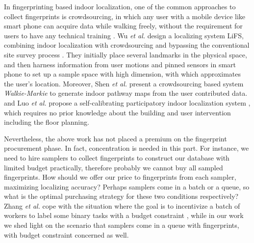 \documentclass[10pt,conference,compsocconf,letterpaper]{IEEEtran}
\begin{document}
In fingerprinting based indoor localization, one of the common approaches to collect fingerprints is crowdsourcing, in which any user with a mobile device like smart phone can acquire data while walking freely, without the requirement for users to have any technical training \cite{}. Wu \emph{et al.} design a localizing system LiFS, combining indoor localization with crowdsourcing and bypassing the conventional site survey process \cite{Yang12,Chenshu14}. They initially place several landmarks in the physical space, and then harness information from user motions and pinned sensors in smart phone to set up a sample space with high dimension, with which approximates the user's location. %
Moreover, Shen \emph{et al.} present a crowdsourcing based system \emph{Walkie-Markie} \cite{walkie} to generate indoor pathway maps from the user contributed data. %
and Luo \emph{et al.} propose a self-calibrating participatory indoor localization system \cite{piloc}, which requires no prior knowledge about the building and user intervention including the floor planning. %

Nevertheless, the above work has not placed a premium on the fingerprint procurement phase. %
In fact, concentration is needed in this part. For instance, we need to hire samplers to collect fingerprints to construct our database with limited budget practically, therefore probably we cannot buy all sampled fingerprints. How should we offer our price to fingerprints from each sampler, maximizing localizing accuracy? Perhaps samplers come in a batch or a queue, so what is the optimal purchasing strategy for these two conditions respectively? Zhang \emph{et al.} cope with the situation where the goal is to incentivize a batch of workers to label some binary tasks with a budget constraint \cite{zhang2015incentivize}, while in our work we shed light on the scenario that samplers come in a queue with fingerprints, with budget constraint concerned as well.
\end{document}
